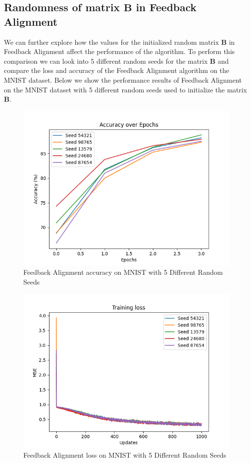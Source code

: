 \documentclass[12pt, letterpaper]{article}
\begin{document}
\subsection{Randomness of matrix $\mathbf{B}$ in Feedback Alignment}

We can further explore how the values for the initialized random matrix $\mathbf{B}$ in Feedback Alignment affect the performance of the algorithm. To perform this comparison we can look into 5 different random seeds for the matrix $\mathbf{B}$ and compare the loss and accuracy of the Feedback Alignment algorithm on the MNIST dataset. Below we show the performance results of Feedback Alignment on the MNIST dataset with 5 different random seeds used to initialize the matrix $\mathbf{B}$.

\begin{figure}[H]
    \centering
    \includegraphics[width=.7\textwidth]{feedback_alignment_vary_B_accuracy.png}
    \caption{Feedback Alignment accuracy on MNIST with 5 Different Random Seeds}
    \label{fig:feedback_alignment_vary_B_accuracy}
\end{figure}

\begin{figure}[H]
    \centering
    \includegraphics[width=.7\textwidth]{feedback_alignment_vary_B_loss.png}
    \caption{Feedback Alignment loss on MNIST with 5 Different Random Seeds}
    \label{fig:feedback_alignment_vary_B_loss}
\end{figure}
\end{document}
